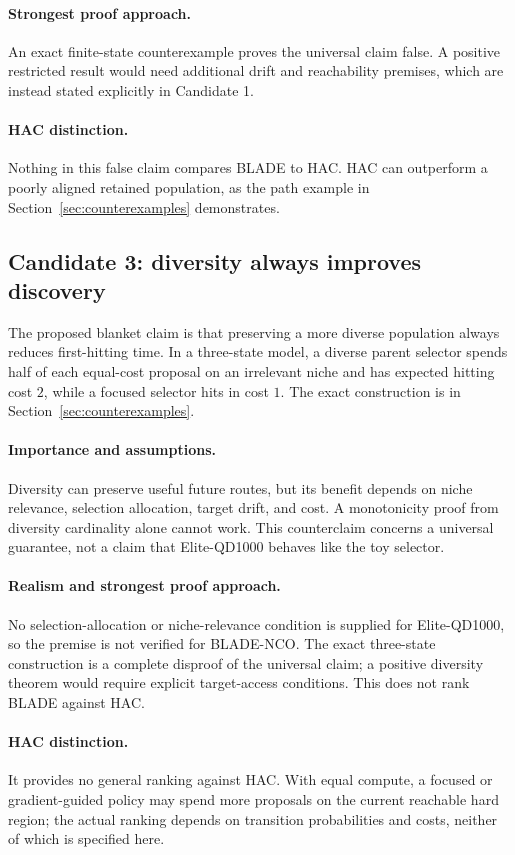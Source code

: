 \paragraph{Strongest proof approach.} An exact finite-state counterexample proves the universal claim false. A positive restricted result would need additional drift and reachability premises, which are instead stated explicitly in Candidate 1.

\paragraph{HAC distinction.} Nothing in this false claim compares BLADE to
HAC. HAC can outperform a poorly aligned retained population, as the path
example in Section~\ref{sec:counterexamples} demonstrates.

\subsection{Candidate 3: diversity always improves discovery}
   The
proposed blanket claim is that preserving a more
diverse population always reduces first-hitting time. In a three-state model,
a diverse parent selector spends half of each equal-cost proposal on an
irrelevant niche and has expected hitting cost $2$, while a focused selector
hits in cost $1$. The exact construction is in Section~\ref{sec:counterexamples}.

\paragraph{Importance and assumptions.} Diversity can preserve useful future
routes, but its benefit depends on niche relevance, selection allocation,
target drift, and cost. A monotonicity proof from diversity cardinality alone
cannot work. This counterclaim concerns a universal guarantee, not a claim
that Elite-QD1000 behaves like the toy selector.

\paragraph{Realism and strongest proof approach.} No selection-allocation or niche-relevance condition is supplied for Elite-QD1000, so the premise is not verified for BLADE-NCO. The exact three-state construction is a complete disproof of the universal claim; a positive diversity theorem would require explicit target-access conditions. This does not rank BLADE against HAC.

\paragraph{HAC distinction.} It provides no general ranking against HAC.
With equal compute, a focused or gradient-guided policy may spend more
proposals on the current reachable hard region; the actual ranking depends
on transition probabilities and costs, neither of which is specified here.
